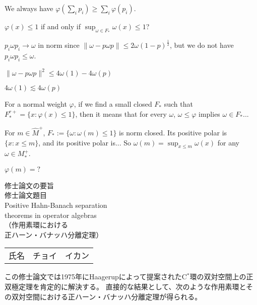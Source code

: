 \documentclass[noamsfonts,a4paper,10pt]{amsart}
\theoremstyle{plain}
\theoremstyle{definition}
\theoremstyle{remark}
\begin{document}
We always have $\varphi(\sum_ip_i)\ge\sum_i\varphi(p_i)$.


$\varphi(x)\le1$ if and only if $\sup_{\omega\in F_*}\omega(x)\le1$?




$p_i\omega p_i\to\omega$ in norm since $\|\omega-p\omega p\|\le2\omega(1-p)^{\frac12}$, but we do not have $p_i\omega p_i\le\omega$.

$\|\omega-p\omega p\|^2\le4\omega(1)-4\omega(p)$

$4\omega(1)\lesssim 4\omega(p)$


For a normal weight $\varphi$, if we find a small closed $F_*$ such that $F_*^{r+}=\{x:\varphi(x)\le1\}$, then it means that for every $\omega$, $\omega\le\varphi$ implies $\omega\in F_*$...


For $m\in\widehat M^+$, $F_*:=\{\omega:\omega(m)\le1\}$ is norm closed.
Its positive polar is $\{x:x\le m\}$, and its positive polar is...
So $\omega(m)=\sup_{x\le m}\omega(x)$ for any $\omega\in M_*^+$.


$\varphi(m)=?$

\fi










\newpage
\thispagestyle{empty}

\begin{center}
{\huge 修士論文の要旨}\\[36pt]
{\Huge 修士論文題目}\\[24pt]
{\Huge Positive Hahn-Banach separation\\[8pt]
theorems in operator algebras}\\[24pt]
{\huge （作用素環における\\[8pt]
正ハーン・バナッハ分離定理）}\\[36pt]
\begin{tabular}{cl}
{\LARGE 氏名} & {\LARGE チョイ　イカン}\\[36pt]
\end{tabular}
\end{center}



この修士論文では1975年にHaagerupによって提案されたC$^*$環の双対空間上の正双極定理を肯定的に解決する。
直接的な結果として、次のような作用素環とその双対空間における正ハーン・バナッハ分離定理が得られる。
\end{document}

